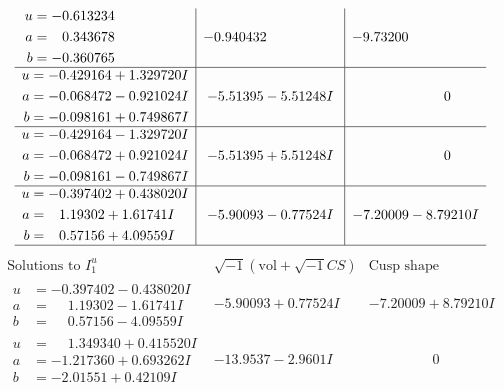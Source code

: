 \documentclass[1p]{elsarticle_modified}
\theoremstyle{definition}
\newcommand{\I}{\sqrt{-1}}
\begin{document}
$$\begin{array}{c|c|c}
\begin{aligned}
u &= -0.613234\phantom{ +0.000000I} \\
a &= \phantom{-}0.343678\phantom{ +0.000000I} \\
b &= -0.360765\phantom{ +0.000000I}\end{aligned}
 & -0.940432\phantom{ +0.000000I} & -9.73200\phantom{ +0.000000I} \\ \hline\begin{aligned}
u &= -0.429164 + 1.329720 I \\
a &= -0.068472 - 0.921024 I \\
b &= -0.098161 + 0.749867 I\end{aligned}
 & -5.51395 - 5.51248 I & \phantom{-0.000000 } 0 \\ \hline\begin{aligned}
u &= -0.429164 - 1.329720 I \\
a &= -0.068472 + 0.921024 I \\
b &= -0.098161 - 0.749867 I\end{aligned}
 & -5.51395 + 5.51248 I & \phantom{-0.000000 } 0 \\ \hline\begin{aligned}
u &= -0.397402 + 0.438020 I \\
a &= \phantom{-}1.19302 + 1.61741 I \\
b &= \phantom{-}0.57156 + 4.09559 I\end{aligned}
 & -5.90093 - 0.77524 I & -7.20009 - 8.79210 I\\
 \hline 
 \end{array}$$\newpage$$\begin{array}{c|c|c}  
\text{Solutions to }I^u_{1}& \I (\text{vol} + \sqrt{-1}CS) & \text{Cusp shape}\\
 \hline 
\begin{aligned}
u &= -0.397402 - 0.438020 I \\
a &= \phantom{-}1.19302 - 1.61741 I \\
b &= \phantom{-}0.57156 - 4.09559 I\end{aligned}
 & -5.90093 + 0.77524 I & -7.20009 + 8.79210 I \\ \hline\begin{aligned}
u &= \phantom{-}1.349340 + 0.415520 I \\
a &= -1.217360 + 0.693262 I \\
b &= -2.01551 + 0.42109 I\end{aligned}
 & -13.9537 - 2.9601 I & \phantom{-0.000000 } 0 \\ \hline\begin{aligned}

\end{aligned}
\end{array}$$
\end{document}

